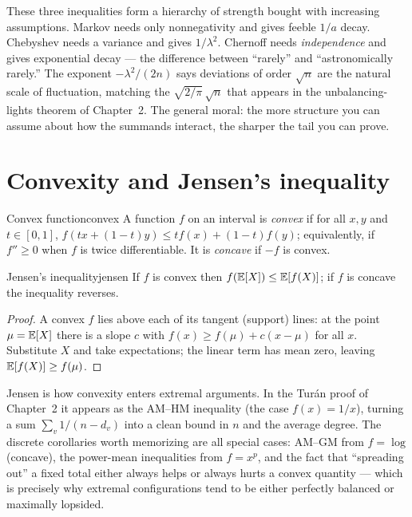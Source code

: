 \begin{insight}
These three inequalities form a hierarchy of strength bought with increasing
assumptions. Markov needs only nonnegativity and gives feeble $1/a$ decay.
Chebyshev needs a variance and gives $1/\lambda^2$. Chernoff needs
\emph{independence} and gives exponential decay --- the difference between
``rarely'' and ``astronomically rarely.'' The exponent $-\lambda^2/(2n)$ says
deviations of order $\sqrt n$ are the natural scale of fluctuation, matching the
$\sqrt{2/\pi}\,\sqrt n$ that appears in the unbalancing-lights theorem of
Chapter~2. The general moral: the more structure you can assume about how the
summands interact, the sharper the tail you can prove.
\end{insight}

\section{Convexity and Jensen's inequality}

\begin{definition}{Convex function}{convex}
A function $f$ on an interval is \emph{convex} if for all $x,y$ and
$t\in[0,1]$, $f(tx+(1-t)y)\le t f(x)+(1-t)f(y)$; equivalently, if $f''\ge0$ when
$f$ is twice differentiable. It is \emph{concave} if $-f$ is convex.
\end{definition}

\begin{theorem}{Jensen's inequality}{jensen}
If $f$ is convex then $f(\mathbb{E}[X])\le\mathbb{E}[f(X)]$; if $f$ is concave the inequality
reverses.
\end{theorem}

\begin{proof}
A convex $f$ lies above each of its tangent (support) lines: at the point
$\mu=\mathbb{E}[X]$ there is a slope $c$ with $f(x)\ge f(\mu)+c(x-\mu)$ for all $x$.
Substitute $X$ and take expectations; the linear term has mean zero, leaving
$\mathbb{E}[f(X)]\ge f(\mu)$.
\end{proof}

\begin{insight}
Jensen is how convexity enters extremal arguments. In the Turán proof of
Chapter~2 it appears as the AM--HM inequality (the case $f(x)=1/x$), turning a
sum $\sum_v 1/(n-d_v)$ into a clean bound in $n$ and the average degree. The
discrete corollaries worth memorizing are all special cases: AM--GM from
$f=\log$ (concave), the power-mean inequalities from $f=x^p$, and the fact that
``spreading out'' a fixed total either always helps or always hurts a convex
quantity --- which is precisely why extremal configurations tend to be either
perfectly balanced or maximally lopsided.
\end{insight}

